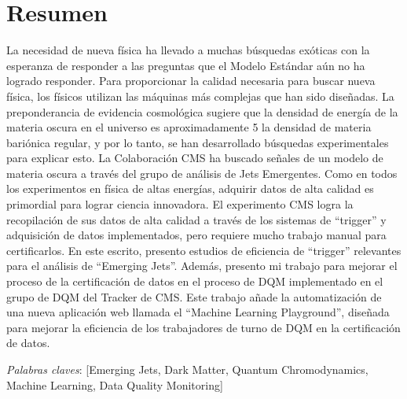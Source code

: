 \chapter{Resumen}

La necesidad de nueva física ha llevado a muchas búsquedas exóticas con la esperanza de responder a las preguntas que el Modelo Estándar aún no ha logrado responder. Para proporcionar la calidad necesaria para buscar nueva física, los físicos utilizan las máquinas más complejas que han sido diseñadas. La preponderancia de evidencia cosmológica sugiere que la densidad de energía de la materia oscura en el universo es aproximadamente 5 la densidad de materia bariónica regular, y por lo tanto, se han desarrollado búsquedas experimentales para explicar esto. La Colaboración CMS ha buscado señales de un modelo de materia oscura a través del grupo de análisis de Jets Emergentes. Como en todos los experimentos en física de altas energías, adquirir datos de alta calidad es primordial para lograr ciencia innovadora. El experimento CMS logra la recopilación de sus datos de alta calidad a través de los sistemas de ``trigger'' y adquisición de datos implementados, pero requiere mucho trabajo manual para certificarlos. En este escrito, presento estudios de eficiencia de ``trigger'' relevantes para el análisis de ``Emerging Jets''. Además, presento mi trabajo para mejorar el proceso de la certificación de datos en el proceso de DQM implementado en el grupo de DQM del Tracker de CMS. Este trabajo añade la automatización de una nueva aplicación web llamada el ``Machine Learning Playground'', diseñada para mejorar la eficiencia de los trabajadores de turno de DQM en la certificación de datos.



\textit{Palabras claves}:  [Emerging Jets, Dark Matter, Quantum Chromodynamics, Machine Learning, Data Quality Monitoring]
